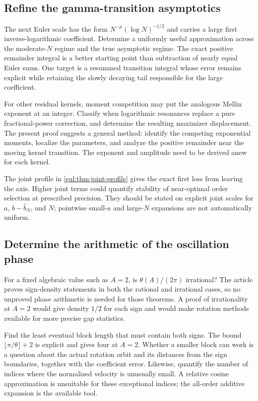 \subsection{Refine the gamma-transition asymptotics}

The next Euler scale has the form
$N^{-\mu}(\log N)^{-1/2}$ and carries a large first inverse-logarithmic
coefficient. Determine a uniformly useful approximation across the
moderate-$N$ regime and the true asymptotic regime. The exact positive
remainder integral is a better starting point than subtraction of
nearly equal Euler sums. One target is a resummed transition integral
whose error remains explicit while retaining the slowly decaying tail
responsible for the large coefficient.

For other residual kernels, moment competition may put the analogous
Mellin exponent at an integer. Classify when logarithmic resonances
replace a pure fractional-power correction, and determine the resulting
maximizer displacement. The present proof suggests a general method:
identify the competing exponential moments, localize the parameters,
and analyze the positive remainder near the moving kernel transition.
The exponent and amplitude need to be derived anew for each kernel.

The joint profile in \cref{eul:thm:joint-profile} gives the exact first
loss from leaving the axis. Higher joint terms could quantify stability
of near-optimal order selection at prescribed precision. They should
be stated on explicit joint scales for $a$, $b-\widehat b_N$, and $N$;
pointwise small-$a$ and large-$N$ expansions are not automatically uniform.

\subsection{Determine the arithmetic of the oscillation phase}

For a fixed algebraic value such as $A=2$, is
$\theta(A)/(2\pi)$ irrational? The article proves sign-density
statements in both the rational and irrational cases, so no unproved
phase arithmetic is needed for those theorems. A proof of irrationality
at $A=2$ would give density $1/2$ for each sign and would make rotation
methods available for more precise gap statistics.

Find the least eventual block length that must contain both signs.
The bound $\lfloor\pi/\theta\rfloor+2$ is explicit and gives four at
$A=2$. Whether a smaller block can work is a question about the actual
rotation orbit and its distances from the sign boundaries, together
with the coefficient error. Likewise, quantify the number of indices
where the normalized velocity is unusually small. A relative cosine
approximation is unsuitable for these exceptional indices; the
all-order additive expansion is the available tool.


